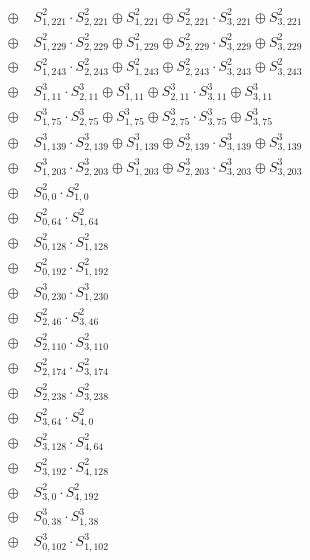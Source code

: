 \begin{align*}
\oplus\; & S^2_{1,221} \cdot S^2_{2,221} \oplus S^2_{1,221} \oplus S^2_{2,221} \cdot S^2_{3,221} \oplus S^2_{3,221}\tag*{weight 1}\\
\oplus\; & S^2_{1,229} \cdot S^2_{2,229} \oplus S^2_{1,229} \oplus S^2_{2,229} \cdot S^2_{3,229} \oplus S^2_{3,229}\tag*{weight 1}\\
\oplus\; & S^2_{1,243} \cdot S^2_{2,243} \oplus S^2_{1,243} \oplus S^2_{2,243} \cdot S^2_{3,243} \oplus S^2_{3,243}\tag*{weight 1}\\
\oplus\; & S^3_{1,11} \cdot S^3_{2,11} \oplus S^3_{1,11} \oplus S^3_{2,11} \cdot S^3_{3,11} \oplus S^3_{3,11}\tag*{weight 1}\\
\oplus\; & S^3_{1,75} \cdot S^3_{2,75} \oplus S^3_{1,75} \oplus S^3_{2,75} \cdot S^3_{3,75} \oplus S^3_{3,75}\tag*{weight 1}\\
\oplus\; & S^3_{1,139} \cdot S^3_{2,139} \oplus S^3_{1,139} \oplus S^3_{2,139} \cdot S^3_{3,139} \oplus S^3_{3,139}\tag*{weight 1}\\
\oplus\; & S^3_{1,203} \cdot S^3_{2,203} \oplus S^3_{1,203} \oplus S^3_{2,203} \cdot S^3_{3,203} \oplus S^3_{3,203}\tag*{weight 1}\\
\oplus\; & S^2_{0,0} \cdot S^2_{1,0}\tag*{weight 1}\\
\oplus\; & S^2_{0,64} \cdot S^2_{1,64}\tag*{weight 1}\\
\oplus\; & S^2_{0,128} \cdot S^2_{1,128}\tag*{weight 1}\\
\oplus\; & S^2_{0,192} \cdot S^2_{1,192}\tag*{weight 1}\\
\oplus\; & S^3_{0,230} \cdot S^3_{1,230}\tag*{weight 1}\\
\oplus\; & S^2_{2,46} \cdot S^2_{3,46}\tag*{weight 1}\\
\oplus\; & S^2_{2,110} \cdot S^2_{3,110}\tag*{weight 1}\\
\oplus\; & S^2_{2,174} \cdot S^2_{3,174}\tag*{weight 1}\\
\oplus\; & S^2_{2,238} \cdot S^2_{3,238}\tag*{weight 1}\\
\oplus\; & S^2_{3,64} \cdot S^2_{4,0}\tag*{weight 1}\\
\oplus\; & S^2_{3,128} \cdot S^2_{4,64}\tag*{weight 1}\\
\oplus\; & S^2_{3,192} \cdot S^2_{4,128}\tag*{weight 1}\\
\oplus\; & S^2_{3,0} \cdot S^2_{4,192}\tag*{weight 1}\\
\oplus\; & S^3_{0,38} \cdot S^3_{1,38}\tag*{weight 1}\\
\oplus\; & S^3_{0,102} \cdot S^3_{1,102}\tag*{weight 1}\\

\end{align*}
